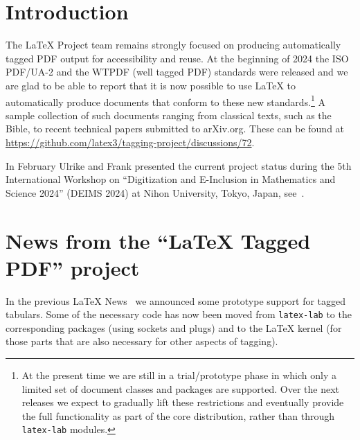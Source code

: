 \documentclass{ltnews}
\providecommand\tubcommand[1]{}
\begin{document}
\tubcommand{\addtolength\textheight{4.2pc}}   %

\maketitle
{  \spaceskip=3.33pt 
\tableofcontents}

\setlength{}

\medskip

\section{Introduction}

The \LaTeX{} Project team remains strongly focused on producing
automatically tagged PDF output for accessibility and reuse. At the
beginning of 2024 the ISO PDF/UA-2 and the WTPDF (well tagged PDF)
standards were released and we are glad to be able to report that it
is now possible to use \LaTeX{} to automatically produce documents
that conform to these new standards.\footnote{At the present time we
are still in a trial/prototype phase in which only a limited set of
document classes and packages are supported.  Over the next releases
we expect to gradually lift these restrictions and eventually provide
the full functionality as part of the core distribution, rather than
through \texttt{latex-lab} modules.}  A sample collection of such
documents ranging from classical texts, such as the Bible, to recent
technical papers submitted to arXiv.org. These can be found at
\url{https://github.com/latex3/tagging-project/discussions/72}.

In February Ulrike and Frank presented the current project status
during the 5th International Workshop on \enquote{Digitization and
  E-Inclusion in Mathematics and Science 2024} (DEIMS 2024) at Nihon
University, Tokyo, Japan, see~\cite{39:deims}.


\section{News from the \enquote{\LaTeX{} Tagged PDF} project}

In the previous \LaTeX{} News~\cite{39:ltnews38} we announced some prototype
support for tagged tabulars. Some of the necessary code has
now been moved from \texttt{latex-lab} to the corresponding packages
(using sockets and plugs) and to the \LaTeX{} kernel (for those parts
that are also necessary for other aspects of tagging).
\end{document}
